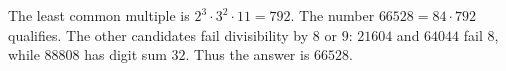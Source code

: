 The least common multiple is $2^3\cdot3^2\cdot11=792$. The number $66528=84\cdot792$ qualifies. The other candidates fail divisibility by $8$ or $9$: $21604$ and $64044$ fail $8$, while $88808$ has digit sum $32$. Thus the answer is $\boxed{66528}$.
